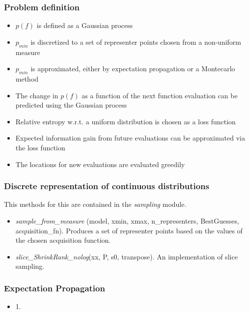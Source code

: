 \documentclass[10pt,handout]{beamer}
\begin{document}
 
\begin{frame}
\frametitle{Problem definition}

\begin{itemize}
	\item $p(f)$ is defined as a Gaussian process
	\item $p_{min}$ is discretized to a set of representer points chosen from
	a non-uniform measure
	\item $p_{min}$ is approximated, either by expectation propagation
	or a Montecarlo method
	\item The change in $p(f)$ as a function of the next function evaluation
	can be predicted using the Gaussian process
	\item Relative entropy w.r.t. a uniform distribution is chosen as a loss
	function
	\item Expected information gain from future evaluations can be 
	approximated via the loss function
	\item The locations for new evaluations are evaluated greedily
\end{itemize}

\end{frame}

\begin{frame}
\frametitle{Discrete representation of continuous distributions}

This methods for this are contained in the \emph{sampling} module.

\begin{itemize}
  \item \emph{sample\_from\_measure}
  (model, xmin, xmax, n\_representers, BestGuesses, acquisition\_fn). Produces 
  a set of representer points based on the values of the chosen acquisition 
  function.
  
  \item \emph{slice\_ShrinkRank\_nolog}(xx, P, s0, transpose). An implementation
  of slice sampling.
\end{itemize}


\end{frame}

\begin{frame}
\frametitle{Expectation Propagation}

\begin{itemize}
  \item 1.
\end{itemize}


\end{frame}
\end{document}
